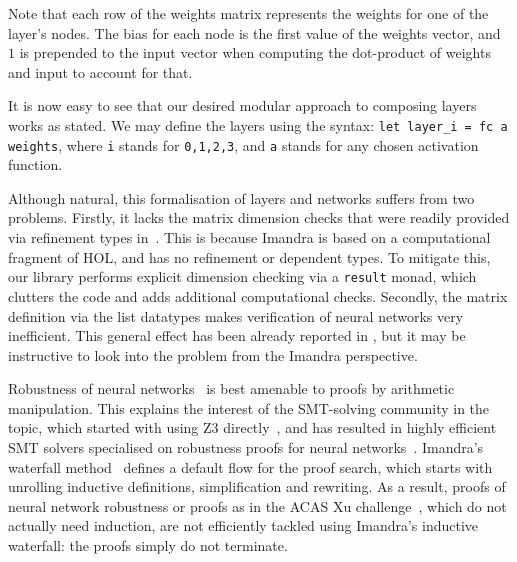 \documentclass[runningheads]{llncs}
\begin{document}
Note that each row of the weights matrix
represents the weights for one of the layer's nodes. The bias for each node is
the first value of the weights vector, and $1$ is prepended to the input vector
when computing the dot-product of weights and input to account for that.



  It is now easy to see that our desired modular approach to composing layers works as stated. We may define the layers using the syntax:
  \lstinline{let layer_i = fc a weights}, where \lstinline{i} stands for \lstinline{0,1,2,3}, and \lstinline{a} stands for any chosen activation function. 

  Although natural, this formalisation of layers and networks suffers from two problems.  Firstly, it lacks the matrix dimension checks that were readily provided  via refinement types in~\cite{KokkeKKAA20}. This is because Imandra is based on a computational fragment of HOL, and has no refinement or dependent types. To mitigate this, our library performs explicit dimension checking via a {\tt result} monad, which clutters the code and adds additional computational checks.
  Secondly, the matrix definition via the list datatypes makes verification of neural networks very inefficient.
  This general effect has been already reported in \cite{KokkeKKAA20}, but it may be instructive to look into the problem from the Imandra perspective.

   Robustness of neural networks~\cite{CKDKKAE22} is best amenable to proofs by arithmetic manipulation. This explains the interest of the SMT-solving community in the topic, which started with using Z3 directly~\cite{HuangKWW17}, and has resulted in highly efficient SMT solvers specialised on robustness proofs for neural networks~\cite{KaBaDiJuKo17Reluplex,KatzHIJLLSTWZDK19}.   Imandra's waterfall method~\cite{PassmoreCIABKKM20} defines a default flow for the proof search, which starts with unrolling inductive definitions, simplification and rewriting.
  As a result, proofs of neural network robustness or proofs as in the ACAS Xu challenge~\cite{KaBaDiJuKo17Reluplex,KatzHIJLLSTWZDK19}, which do not actually need induction,
  are not efficiently tackled using Imandra's inductive waterfall: the proofs simply do not terminate.
\end{document}
